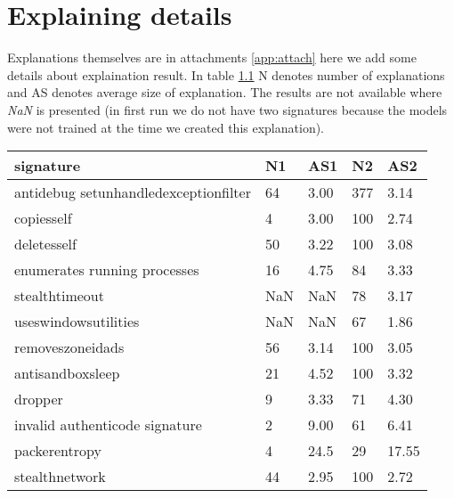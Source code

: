 \chapter{Explaining details} \label{app:expl}
Explanations themselves are in attachments \ref{app:attach} here we add some details about explaination result. In table \ref{tab:explain_detail} N denotes number of explanations and AS denotes average size of explanation. The results are not available where \emph{NaN} is presented (in first run we do not have two signatures because the models were not trained at the time we created this explanation).

\begin{table}[h]
    \centering
    \begin{tabular}{lllll}
      \toprule
      \textbf{signature} &
      \textbf{N1} &
      \textbf{AS1} &
      \textbf{N2} &
      \textbf{AS2}
      \\
      \midrule
      antidebug setunhandledexceptionfilter & 64 & 3.00 & 377 & 3.14  \\
      \midrule
      copiesself & 4 & 3.00 & 100 & 2.74 \\
      \midrule
      deletesself & 50 & 3.22 & 100 & 3.08 \\
      \midrule
      enumerates running processes & 16 & 4.75 & 84 & 3.33 \\
      \midrule
      stealthtimeout & NaN & NaN & 78 &  3.17 \\
      \midrule
      useswindowsutilities & NaN & NaN & 67 &  1.86 \\
      \midrule
      removeszoneidads & 56 & 3.14 & 100 & 3.05 \\
      \midrule
      antisandboxsleep & 21 & 4.52 & 100 & 3.32 \\
      \midrule
      dropper & 9 & 3.33 & 71 & 4.30 \\
      \midrule
      invalid authenticode signature & 2 & 9.00 & 61 & 6.41 \\
      \midrule
      packerentropy & 4 & 24.5 & 29 & 17.55 \\
      \midrule
      stealthnetwork & 44 & 2.95 & 100 & 2.72 \\
      \bottomrule
    \end{tabular}
    \label{tab:explain_detail}
  \end{table}